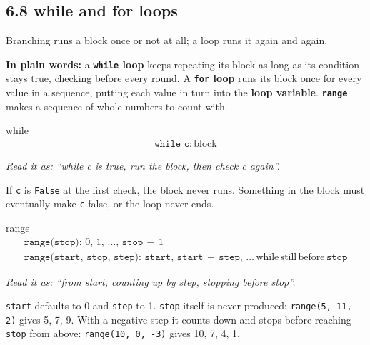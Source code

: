 \documentclass[11pt]{article}
\begin{document}
\begin{keepsection}
\section{6.8 while and for loops}

Branching runs a block once or not at all; a loop runs it again and again.

\begin{plainbox}\textbf{In plain words:} a \textbf{\texttt{while} loop} keeps repeating its block as long as its condition stays true, checking before every round. A \textbf{\texttt{for} loop} runs its block once for every value in a sequence, putting each value in turn into the \textbf{loop variable}. \textbf{\texttt{range}} makes a sequence of whole numbers to count with.\end{plainbox}

\begin{equationcard}{while}
\[ \begin{gathered} \texttt{while c:}\, \text{block} \end{gathered} \]
{\small \emph{Read it as: “while c is true, run the block, then check c again”.}\par  If \texttt{c} is \texttt{False} at the first check, the block never runs. Something in the block must eventually make \texttt{c} false, or the loop never ends.}
\end{equationcard}

\begin{equationcard}{range}
\[ \begin{gathered} \texttt{range(stop)}:\, 0,\, 1,\, …,\, \texttt{stop}\, -\, 1 \\ \texttt{range(start, stop, step)}:\, \texttt{start},\, \texttt{start}\, +\, \texttt{step},\, …\, \text{while}\, \text{still}\, \text{before}\, \texttt{stop} \end{gathered} \]
{\small \emph{Read it as: “from start, counting up by step, stopping before stop”.}\par  \texttt{start} defaults to 0 and \texttt{step} to 1. \texttt{stop} itself is never produced: \texttt{range(5, 11, 2)} gives 5, 7, 9. With a negative step it counts down and stops before reaching \texttt{stop} from above: \texttt{range(10, 0, -3)} gives 10, 7, 4, 1.}
\end{equationcard}


\end{keepsection}
\end{document}
